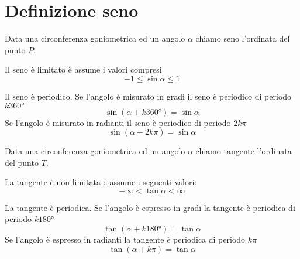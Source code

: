 \section{Definizione seno}\label{sec:definizione-seno}
\begin{defn}
Data una circonferenza goniometrica ed un angolo $\alpha$ chiamo seno l'ordinata del punto $P$.
\end{defn}
\begin{prop}\label{prop:Cosenolimitato}
	Il seno è limitato
è	assume i valori compresi
	\begin{equation*}
	-1\leq \sin\alpha \leq 1
	\end{equation*}
\end{prop}
\begin{prop}\label{Prop:periodoseno}
	Il seno è periodico. 
	Se l'angolo è misurato in gradi il seno è periodico di periodo $k\ang{360}$
	\begin{equation*}
	\sin(\alpha+k\ang{360;;})=\sin\alpha
	\end{equation*}
	Se l'angolo è misurato in radianti il seno è periodico di periodo $2k\pi$
	\begin{equation*}
	\sin(\alpha+2k\pi)=\sin\alpha
	\end{equation*}
\end{prop}
\begin{defn}
	Data una circonferenza goniometrica ed un angolo $\alpha$ chiamo tangente l'ordinata del punto $T$.
\end{defn}
\begin{prop}\label{prop:tangentenonlimitata}
La tangente è non limitata e assume i seguenti valori:
\begin{equation*}
-\infty<\tan\alpha< \infty
\end{equation*}
\end{prop}
{\centering
	
	\par}
\begin{prop}\label{prop:PeriodoTangente}
	La tangente è periodica.
	Se l'angolo è espresso in gradi la tangente è periodica di periodo $k\ang{180}$
	\begin{equation*}
	\tan(\alpha+k\ang{180;;})=\tan\alpha
	\end{equation*}
	Se l'angolo è espresso in radianti la tangente è periodica di periodo $k\pi$
	\begin{equation*}
	\tan(\alpha+k\pi)=\tan\alpha
	\end{equation*}
\end{prop}
